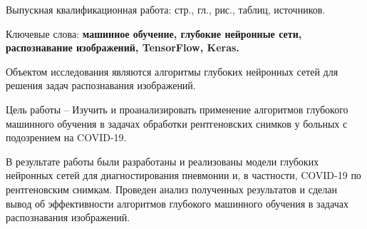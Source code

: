 
Выпускная квалификационная работа: \pageref{LastPage} стр., 
 гл., 
\totalfigures{} рис.,
\totaltables{} таблиц,
 источников.

Ключевые слова: \textbf{машинное обучение, глубокие нейронные сети, распознавание изображений, TensorFlow, Keras.}

Объектом исследования являются алгоритмы глубоких нейронных сетей для решения задач распознавания изображений. 

Цель работы –  Изучить и проанализировать применение алгоритмов глубокого машинного обучения  в задачах обработки рентгеновских снимков у больных с подозрением на COVID-19.

В результате работы были разработаны и реализованы модели глубоких нейронных сетей для диагностирования пневмонии и, в частности, COVID-19 по рентгеновским снимкам. Проведен анализ полученных результатов и сделан вывод об эффективности алгоритмов глубокого машинного обучения в задачах распознавания изображений.

\clearpage